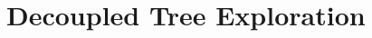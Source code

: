 \documentclass[11pt,twoside]{report}
\begin{document}
\chapter{Decoupled Tree Exploration}

\end{document}
